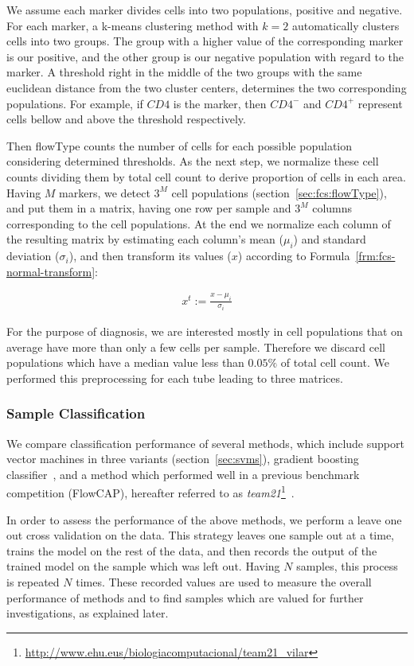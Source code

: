 We assume each marker divides cells into two populations, positive and negative. For each marker, a k-means clustering method with $k = 2$ automatically clusters cells into two groups. The group with a higher value of the corresponding marker is our positive, and the other group is our negative population with regard to the marker. A threshold right in the middle of the two groups with the same euclidean distance from the two cluster centers, determines the two corresponding populations. For example, if $CD4$ is the marker, then $CD4^-$ and $CD4^+$ represent cells bellow and above the threshold respectively.

Then flowType counts the number of cells for each possible population considering determined thresholds. As the next step, we normalize these cell counts dividing them by total cell count to derive proportion of cells in each area. Having $M$ markers, we detect $3^M$ cell populations (section~\ref{sec:fcs:flowType}), and put them in a matrix, having one row per sample and $3^M$ columns corresponding to the cell populations. At the end we normalize each column of the resulting matrix by estimating each column's mean ($\mu_i$) and standard deviation ($\sigma_i$), and then transform its values ($x$) according to Formula~\ref{frm:fcs-normal-transform}:

\begin{align}
  x^t := \frac{x - \mu_i}{\sigma_i}
  \label{frm:fcs-normal-transform}
\end{align}

For the purpose of diagnosis, we are interested mostly in cell populations that on average have more than only a few cells per sample. Therefore we discard cell populations which have a median value less than $0.05\%$ of total cell count. We performed this preprocessing for each tube leading to three matrices.

\subsubsection{Sample Classification}
We compare classification performance of several methods, which include support vector machines in three variants (section~\ref{sec:svms}), gradient boosting classifier~\cite{friedman2002stochastic}, and a method which performed well in a previous benchmark competition (FlowCAP), hereafter referred to as \emph{team21}\footnote{\url{http://www.ehu.eus/biologiacomputacional/team21_vilar}}~\cite{Aghaeepour2013Critical}. 

In order to assess the performance of the above methods, we perform a leave one out cross validation on the data. This strategy leaves one sample out at a time, trains the model on the rest of the data, and then records the output of the trained model on the sample which was left out. Having $N$ samples, this process is repeated $N$ times. These recorded values are used to measure the overall performance of methods and to find samples which are valued for further investigations, as explained later.

